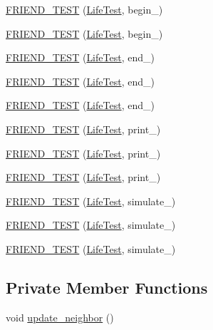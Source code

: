 \begin{DoxyCompactItemize}
\item 
\hyperlink{classLife_a8606185f32fefb0b7901361ba8199ba7}{F\-R\-I\-E\-N\-D\-\_\-\-T\-E\-S\-T} (\hyperlink{classLife_ac09a12090bbd959da33d05c9c8bfa744}{Life\-Test}, begin\-\_)
\item 
\hyperlink{classLife_aa9c39a3d7520c1009e1da0602d629eb9}{F\-R\-I\-E\-N\-D\-\_\-\-T\-E\-S\-T} (\hyperlink{classLife_ac09a12090bbd959da33d05c9c8bfa744}{Life\-Test}, begin\-\_)
\item 
\hyperlink{classLife_ad779f3cd0999dcf98464aba88d2035c2}{F\-R\-I\-E\-N\-D\-\_\-\-T\-E\-S\-T} (\hyperlink{classLife_ac09a12090bbd959da33d05c9c8bfa744}{Life\-Test}, end\-\_)
\item 
\hyperlink{classLife_a2eb1e3410293f2f529eec0ffd26709ec}{F\-R\-I\-E\-N\-D\-\_\-\-T\-E\-S\-T} (\hyperlink{classLife_ac09a12090bbd959da33d05c9c8bfa744}{Life\-Test}, end\-\_)
\item 
\hyperlink{classLife_a1a0117c11dc36525358ea519e591a452}{F\-R\-I\-E\-N\-D\-\_\-\-T\-E\-S\-T} (\hyperlink{classLife_ac09a12090bbd959da33d05c9c8bfa744}{Life\-Test}, end\-\_)
\item 
\hyperlink{classLife_add4c6210e97d19c88734748e657e09ad}{F\-R\-I\-E\-N\-D\-\_\-\-T\-E\-S\-T} (\hyperlink{classLife_ac09a12090bbd959da33d05c9c8bfa744}{Life\-Test}, print\-\_)
\item 
\hyperlink{classLife_a54f4bff99aab8266a08d0715edf1cbb7}{F\-R\-I\-E\-N\-D\-\_\-\-T\-E\-S\-T} (\hyperlink{classLife_ac09a12090bbd959da33d05c9c8bfa744}{Life\-Test}, print\-\_)
\item 
\hyperlink{classLife_add82559e1cec37d7da8bd9857d9aad9f}{F\-R\-I\-E\-N\-D\-\_\-\-T\-E\-S\-T} (\hyperlink{classLife_ac09a12090bbd959da33d05c9c8bfa744}{Life\-Test}, print\-\_)
\item 
\hyperlink{classLife_a5090a8976048ebe66bc48d05906fc72d}{F\-R\-I\-E\-N\-D\-\_\-\-T\-E\-S\-T} (\hyperlink{classLife_ac09a12090bbd959da33d05c9c8bfa744}{Life\-Test}, simulate\-\_)
\item 
\hyperlink{classLife_ace83f596626267d1c45e79296c9cd059}{F\-R\-I\-E\-N\-D\-\_\-\-T\-E\-S\-T} (\hyperlink{classLife_ac09a12090bbd959da33d05c9c8bfa744}{Life\-Test}, simulate\-\_)
\item 
\hyperlink{classLife_a0c42da57b5105325fcd11bc8d7290fe5}{F\-R\-I\-E\-N\-D\-\_\-\-T\-E\-S\-T} (\hyperlink{classLife_ac09a12090bbd959da33d05c9c8bfa744}{Life\-Test}, simulate\-\_)
\end{DoxyCompactItemize}
\subsection*{Private Member Functions}
\begin{DoxyCompactItemize}
\item 
void \hyperlink{classLife_abd95ec1bee0c005f29c0a21339999718}{update\-\_\-neighbor} ()
\end{DoxyCompactItemize}
